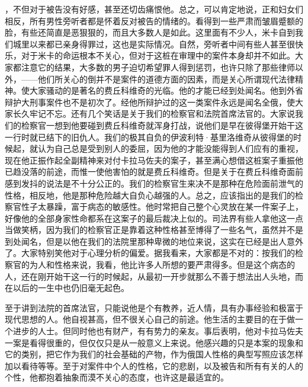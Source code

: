 ，不但对于被告没有好感，甚至还切齿痛恨他。总之，可以肯定地说，正和妇女们相反，所有男性旁听者都是怀着反对被告的情绪的。看得到一些严肃而皱眉蹙额的脸，有些还简直是恶狠狠的，而且大多数人是如此。这里面有不少人，米卡自到我们城里以来都已亲身得罪过，这也是实际情况。自然，旁听者中间有些人甚至很快乐，对于米卡的命运根本不关心，但对于这桩在审理中的案件本身却并不如此。大家都注意它的结果，大多数的男子迫切希望罪人得到惩罚，也许只除了那些律师以外，——他们所关心的倒并不是案件的道德方面的因素，而是关心所谓现代法律精神。使大家骚动的是著名的费丘科维奇的光临。他的才能已经到处闻名。他到外省辩护大刑事案件也不是初次了。经他所辩护过的这一类案件永远是闻名全俄，使大家长久牢记不忘。还有几个笑话是关于我们的检察官和法院首席法官的。大家说我们的检察官一想到他要碰到费丘科维奇就浑身打战，说他们是早在彼得堡开始干这一行时就已结下的旧仇人。我们的极其自负的伊波利特·基里洛维奇从彼得堡的时候起，就认为自己总是受到别人的委屈，因为他的才能没能得到人们应有的重视，现在他正振作起全副精神来对付卡拉马佐夫的案子，甚至满心想借这桩案子重振他已趋没落的前途，而惟一使他害怕的就是费丘科维奇。但是关于在费丘科维奇面前感到发抖的说法是不十分公正的。我们的检察官生来决不是那种在危险面前泄气的性格，相反地，他是那种危险越大自负心越强的人。总之，应该指出的是我们的检察官性子太暴躁，富于病态的敏感性。他时常把自己整个心灵放在某一件案子上，好像他的全部身家性命都系在这案子的最后裁决上似的。司法界有些人拿他这一点当做笑柄，因为我们的检察官正是靠着这种性格甚至博得了一些名气，虽然并不是到处闻名，但是以他在我们的法院里那种卑微的地位来说，这实在已经是出人意外了。大家特别笑他对于心理分析的偏爱。据我看来，大家都是不对的：按我们的检察官的为人和性格来说，我看，他比许多人所想的要严肃得多。但是这个病态的人，还在刚开始干这一行的时候起，从最初一开步就那么不善于想法出人头地，而在以后的一生中也仍旧毫无起色。
\par 至于讲到法院的首席法官，只能说他是个有教养，近人情，具有办事经验和极富于现代思想的人。他自视甚高，但不很关心自己的前途。他生活的主要目的在于做一个进步的人士。但同时他也有财产，有有势力的亲友。事后表明，他对卡拉马佐夫一案是看得很重的，但仅仅只是从一般意义上来说。他感兴趣的只是本案的现象和它的类别，把它作为我们的社会基础的产物，作为俄国人性格的典型写照应该怎样加以看待等等。至于对案件中个人的性格，它的悲剧，以及被告和所有有关的人的个性，他都抱着抽象而漠不关心的态度，也许这是最适宜的。
